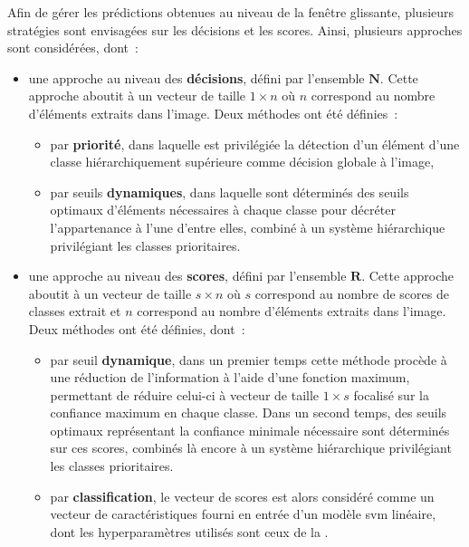 Afin de gérer les prédictions obtenues au niveau de la fenêtre glissante, plusieurs stratégies sont envisagées sur les décisions et les scores. Ainsi, plusieurs approches sont considérées, dont~:
\begin{itemize}
    \item   une approche au niveau des \textbf{décisions}, défini par l'ensemble $\mathbf{N}$. Cette approche aboutit à un vecteur de taille $1 \times n$ où $n$ correspond au nombre d'éléments extraits dans l'image. Deux méthodes ont été définies~:
            \begin{itemize}
                \item par \textbf{priorité}, dans laquelle est privilégiée la détection d'un élément d'une classe hiérarchiquement supérieure comme décision globale à l'image,
                \item par seuils \textbf{dynamiques}, dans laquelle sont déterminés des seuils optimaux d'éléments nécessaires à chaque classe pour décréter l'appartenance à l'une d'entre elles, combiné à un système hiérarchique privilégiant les classes prioritaires.
            \end{itemize}
    \item   une approche au niveau des \textbf{scores}, défini par l'ensemble $\mathbf{R}$. Cette approche aboutit à un vecteur de taille $s \times n$ où $s$ correspond au nombre de scores de classes extrait et $n$ correspond au nombre d'éléments extraits dans l'image. Deux méthodes ont été définies, dont~:~
            \begin{itemize}
                \item par seuil \textbf{dynamique}, dans un premier temps cette méthode procède à une réduction de l'information à l'aide d'une fonction maximum, permettant de réduire celui-ci à vecteur de taille $1 \times s$ focalisé sur la confiance maximum en chaque classe. Dans un second temps, des seuils optimaux représentant la confiance minimale nécessaire sont déterminés sur ces scores, combinés là encore à un système hiérarchique privilégiant les classes prioritaires.
                \item par \textbf{classification}, le vecteur de scores est alors considéré comme un vecteur de caractéristiques fourni en entrée d'un modèle \gls{svm} linéaire, dont les hyperparamètres utilisés sont ceux de la .
            \end{itemize}
\end{itemize}\par

